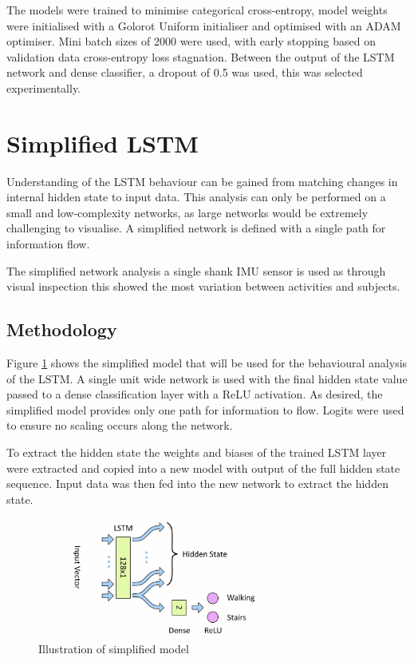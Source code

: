 \documentclass[sensors,article,submit,moreauthors,pdftex]{Definitions/mdpi}
\begin{document}
The models were trained to minimise categorical cross-entropy, model weights were initialised with a Golorot Uniform initialiser\cite{Glorot2010} and optimised with an ADAM optimiser\cite{Kingma2015}.  Mini batch sizes of 2000 were used, with early stopping based on validation data cross-entropy loss stagnation. Between the output of the LSTM network and dense classifier, a dropout of 0.5 was used, this was selected experimentally.



\section{Simplified LSTM}
\label{sec:simplified_model}
Understanding of the LSTM behaviour can be gained from matching changes in internal hidden state to input data. This analysis can only be performed on a small and low-complexity networks, as large networks would be extremely challenging to visualise. A simplified network is defined with a single path for information flow.

The simplified network analysis a single shank IMU sensor is used as through visual inspection this showed the most variation between activities and subjects.

\subsection{Methodology}
Figure \ref{fig:simplfied_lstm_model} shows the simplified model that will be used for the behavioural analysis of the LSTM. A single unit wide network is used with the final hidden state value passed to a dense classification layer with a ReLU activation. As desired, the simplified model provides only one path for information to flow. Logits were used to ensure no scaling occurs along the network. 

To extract the hidden state the weights and biases of the trained LSTM layer were extracted and copied into a new model with output of the full hidden state sequence. Input data was then fed into the new network to extract the hidden state.

\begin{figure}[!htb]
    \centering
    \includegraphics[width=0.8\textwidth]{Figures/lstm/Simplified_Network.jpg}
    \caption{Illustration of simplified model}
    \label{fig:simplfied_lstm_model}
\end{figure}
\end{document}
